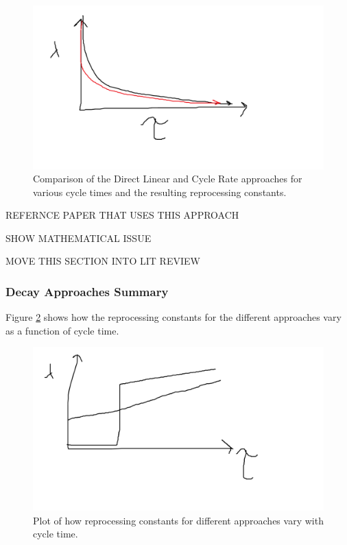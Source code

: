 \begin{figure}[H]
  \centering
  \includegraphics[scale=0.25]{images/direct_exp_compare.png}
  \caption{Comparison of the Direct Linear and Cycle Rate approaches for various cycle times and the resulting reprocessing constants.}
   \label{fig:dl_cr_compare}
\end{figure}


REFERNCE PAPER THAT USES THIS APPROACH

SHOW MATHEMATICAL ISSUE

MOVE THIS SECTION INTO LIT REVIEW

\subsubsection{Decay Approaches Summary}

Figure \ref{fig:repr_cnst} shows how the reprocessing constants for the different approaches vary as a function of cycle time.

\begin{figure}[H]
  \centering
  \includegraphics[scale=0.45]{images/repr_cnst_cycle.png}
  \caption{Plot of how reprocessing constants for different approaches vary with cycle time.}
   \label{fig:repr_cnst}
\end{figure}

